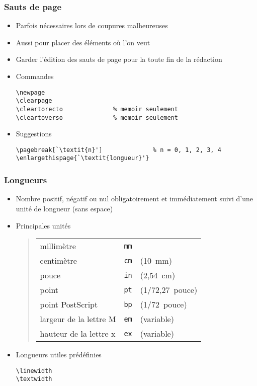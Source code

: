 \begin{frame}[fragile]
  \frametitle{Sauts de page}
  \begin{itemize}
  \item Parfois nécessaires lors de coupures malheureuses
  \item Aussi pour placer des éléments où l'on veut
  \item Garder l'édition des sauts de page pour la toute fin de la
    rédaction
  \item<2-> Commandes
\begin{lstlisting}
\newpage
\clearpage
\cleartorecto              % memoir seulement
\cleartoverso              % memoir seulement
\end{lstlisting}
  \item<3-> Suggestions
\begin{lstlisting}
\pagebreak[`\textit{n}']              % n = 0, 1, 2, 3, 4
\enlargethispage{`\textit{longueur}'}
\end{lstlisting}
  \end{itemize}
\end{frame}

\begin{frame}[fragile]
  \frametitle{Longueurs}
  \begin{itemize}[<+->]
  \item Nombre positif, négatif ou nul \alert{obligatoirement} et
    \alert{immédiatement} suivi d'une unité de longueur (sans espace)
  \item Principales unités
    \begin{quote}
      \begin{tabularx}{\linewidth}{XcX}
        millimètre & \texttt{mm} \\
        centimètre & \texttt{cm} & (10~mm) \\
        pouce      & \texttt{in} & (2,54~cm) \\
        point      & \texttt{pt} & (1/72,27~pouce) \\
        point PostScript     & \texttt{bp} & (1/72~pouce) \\
        largeur de la lettre M & \texttt{em} & (variable) \\
        hauteur de la lettre x & \texttt{ex} & (variable)
      \end{tabularx}
    \end{quote}
  \item Longueurs utiles prédéfinies
\begin{lstlisting}
\linewidth
\textwidth
\end{lstlisting}
  \end{itemize}
\end{frame}

